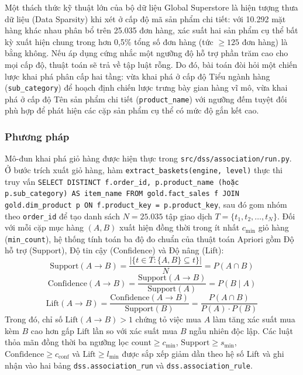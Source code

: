 Một thách thức kỹ thuật lớn của bộ dữ liệu Global Superstore là hiện tượng thưa dữ liệu (Data Sparsity) khi xét ở cấp độ mã sản phẩm chi tiết: với 10.292 mặt hàng khác nhau phân bổ trên 25.035 đơn hàng, xác suất hai sản phẩm cụ thể bất kỳ xuất hiện chung trong hơn 0,5\% tổng số đơn hàng (tức $\ge 125$ đơn hàng) là bằng không. Nếu áp dụng cứng nhắc một ngưỡng độ hỗ trợ phần trăm cao cho mọi cấp độ, thuật toán sẽ trả về tập luật rỗng. Do đó, bài toán đòi hỏi một chiến lược khai phá phân cấp hai tầng: vừa khai phá ở cấp độ Tiểu ngành hàng (\texttt{sub\_category}) để hoạch định chiến lược trưng bày gian hàng vĩ mô, vừa khai phá ở cấp độ Tên sản phẩm chi tiết (\texttt{product\_name}) với ngưỡng đếm tuyệt đối phù hợp để phát hiện các cặp sản phẩm cụ thể có mức độ gắn kết cao.

\subsubsection{Phương pháp}

Mô-đun khai phá giỏ hàng được hiện thực trong \texttt{src/dss/association/run.py}. Ở bước trích xuất giỏ hàng, hàm \texttt{extract\_baskets(engine, level)} thực thi truy vấn \texttt{SELECT DISTINCT f.order\_id, p.product\_name (hoặc p.sub\_category) AS item\_name FROM gold.fact\_sales f JOIN gold.dim\_product p ON f.product\_key = p.product\_key}, sau đó gom nhóm theo \texttt{order\_id} để tạo danh sách $N = 25.035$ tập giao dịch $T = \{t_1, t_2, \dots, t_N\}$. Đối với mỗi cặp mục hàng $(A, B)$ xuất hiện đồng thời trong ít nhất $c_{\min}$ giỏ hàng (\texttt{min\_count}), hệ thống tính toán ba độ đo chuẩn của thuật toán Apriori \cite{agrawal1994} gồm Độ hỗ trợ (Support), Độ tin cậy (Confidence) và Độ nâng (Lift):
\begin{equation}
    \text{Support}(A \rightarrow B) = \frac{|\{t \in T : \{A, B\} \subseteq t\}|}{N} = P(A \cap B)
\end{equation}
\begin{equation}
    \text{Confidence}(A \rightarrow B) = \frac{\text{Support}(A \rightarrow B)}{\text{Support}(A)} = P(B \mid A)
\end{equation}
\begin{equation}
    \text{Lift}(A \rightarrow B) = \frac{\text{Confidence}(A \rightarrow B)}{\text{Support}(B)} = \frac{P(A \cap B)}{P(A) \cdot P(B)}
\end{equation}
Trong đó, chỉ số $\text{Lift}(A \rightarrow B) > 1$ chứng tỏ việc mua $A$ làm tăng xác suất mua kèm $B$ cao hơn gấp $\text{Lift}$ lần so với xác suất mua $B$ ngẫu nhiên độc lập. Các luật thỏa mãn đồng thời ba ngưỡng lọc $\text{count} \ge c_{\min}$, $\text{Support} \ge s_{\min}$, $\text{Confidence} \ge c_{\text{conf}}$ và $\text{Lift} \ge l_{\min}$ được sắp xếp giảm dần theo hệ số Lift và ghi nhận vào hai bảng \texttt{dss.association\_run} và \texttt{dss.association\_rule}.

